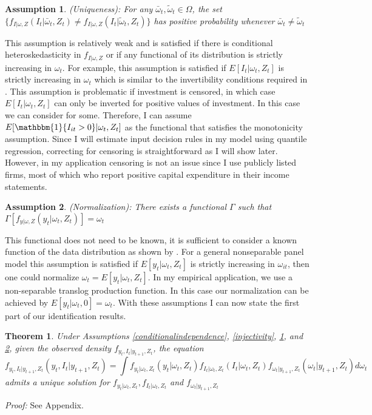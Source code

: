 \documentclass{article}
\newtheorem{assump}{Assumption}[section]
\newtheorem{theorem}{Theorem}[section]
\begin{document}
\begin{assump} \label{uniqueness} (Uniqueness): For any $\bar{\omega}_{t}, \tilde{\omega}_{t}\in \Omega$, the set $\{f_{I|\omega, Z}(I_{t}|\bar{\omega}_{t}, Z_{t})\neq f_{I|\omega, Z}(I_{t}|\tilde{\omega}_{t}, Z_{t})\}$ has positive probability whenever $\bar{\omega}_{t}\neq\tilde{\omega}_{t}$
\end{assump}
This assumption is relatively weak and is satisfied if there is conditional heteroskedasticity in $f_{I|\omega, Z}$ or if any functional of its distribution is strictly increasing in $\omega_{t}$. For example, this assumption is satisfied if $E[I_{t}|\omega_{t},Z_{t}]$ is strictly increasing in $\omega_{t}$ which is similar to the invertibility conditions required in \cite{Olley1996}. This assumption is problematic if investment is censored, in which case $E[I_{t}|\omega_{t},Z_{t}]$ can only be inverted for positive values of investment. In this case we can consider for some. Therefore, I can assume $E[\mathbbm{1}\{I_{it}>0\}|\omega_{t},Z_{t}]$ as the functional that satisfies the monotonicity assumption.  Since I will estimate input decision rules in my model using quantile regression, correcting for censoring is straightforward as I will show later. However, in my application censoring is not an issue since I use publicly listed firms, most of which who report positive capital expenditure in their income statements.

\begin{assump} \label{normalization} (Normalization): There exists a functional $\Gamma$ such that $\Gamma[f_{y|\omega,Z}(y_{t}|\omega_{t}, Z_{t})]=\omega_{t}$
\end{assump}
This functional does not need to be known, it is sufficient to consider a known function of the data distribution as shown by \cite{Arellano2016}. For a general nonseparable panel model this assumption is satisfied if $E[y_{t}|\omega_{t}, Z_{t}]$ is strictly increasing in $\omega_{it}$, then one could normalize $\omega_{t}=E[y_{t}|\omega_{t}, Z_{t}]$. In my empirical application, we use a non-separable translog production function. In this case our normalization can be achieved by $E[y_{t}|\omega_{t}, 0]=\omega_{t}$. With these assumptions I can now state the first part of our identification results.

\begin{theorem} \label{idpart1} Under Assumptions \ref{conditionalindependence}, \ref{injectivity}, \ref{uniqueness}, and \ref{normalization}, given the observed density $f_{y_{t}, I_{t}|y_{t+1}, Z_{t}}$, the equation
\begin{equation}
f_{y_{t}, I_{t}|y_{t+1}, Z_{t}}(y_{t}, I_{t}|y_{t+1}, Z_{t})=\int f_{y_{t}|\omega_{t}, Z_{t}}(y_{t}|\omega_{t}, Z_{t})f_{I_{t}|\omega_{t}, Z_{t}}(I_{t}|\omega_{t}, Z_{t})f_{\omega_{t}|y_{t+1}, Z_{t}}(\omega_{t}|y_{t+1}, Z_{t})d\omega_{t}
\end{equation}
admits a unique solution for $f_{y_{t}|\omega_{t}, Z_{t}}, f_{I_{t}|\omega_{t}, Z_{t}}$ and $f_{\omega_{t}|y_{t+1}, Z_{t}}$
\end{theorem}
\textit{Proof:} See Appendix.\\
\end{document}
